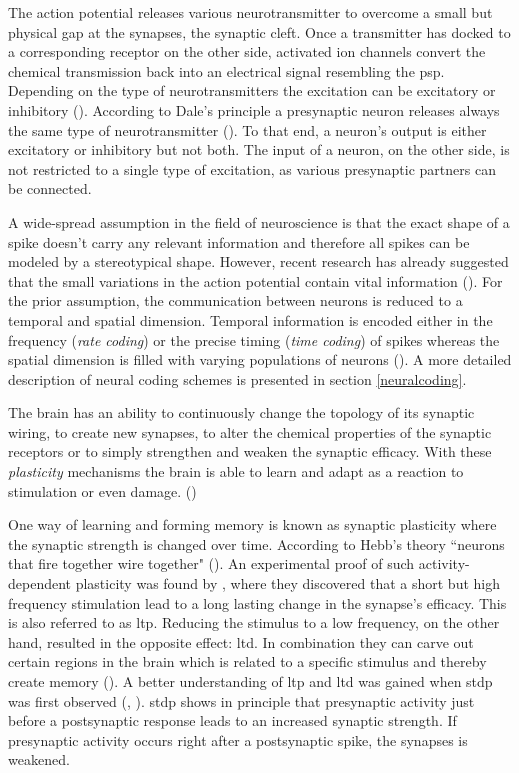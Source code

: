 The action potential releases various neurotransmitter to overcome a small but physical gap at the synapses, the synaptic cleft. Once a transmitter has docked to a corresponding receptor on the other side, activated ion channels convert the chemical transmission back into an electrical signal resembling the \gls{psp}. Depending on the type of neuro\-transmitters the excitation can be excitatory or inhibitory (\citealp{gerstner2014dynamics}). According to Dale's principle a presynaptic neuron releases always the same type of neurotransmitter (\citealp{dale1935pharmacology}). To that end, a neuron's output is either excitatory or inhibitory but not both. The input of a neuron, on the other side, is not restricted to a single type of excitation, as various presynaptic partners can be connected. 

A wide-spread assumption in the field of neuroscience is that the exact shape of a spike doesn't carry any relevant information and therefore all spikes can be modeled by a stereotypical shape. However, recent research has already suggested that the small variations in the action potential contain vital information (\citealp{debanne2013mechanisms}). For the prior assumption, the communication between neurons is reduced to a temporal and spatial dimension. Temporal information is encoded either in the frequency (\emph{rate coding}) or the precise timing (\emph{time coding}) of spikes whereas the spatial dimension is filled with varying populations of neurons (\citealp{gerstner2014dynamics}). A more detailed description of neural coding schemes is presented in section \ref{neuralcoding}.

The brain has an ability to continuously change the topology of its synaptic wiring, to create new synapses, to alter the chemical properties of the synaptic receptors or to simply strengthen and weaken the synaptic efficacy. With these \emph{plasticity} mechanisms the brain is able to learn and adapt as a reaction to stimulation or even damage. (\citealp{gerstner14dynamics})

One way of learning and forming memory is known as synaptic plasticity where the synaptic strength is changed over time. According to Hebb's theory ``neurons that fire together wire together" (\citealp{hebb1949organization}). An experimental proof of such activity-dependent plasticity was found by \citealp{bliss1973long}, where they discovered that a short but high frequency stimulation lead to a long lasting change in the synapse's efficacy. This is also referred to as \gls{ltp}. Reducing the stimulus to a low frequency, on the other hand, resulted in the opposite effect: \gls{ltd}. In combination they can carve out certain regions in the brain which is related to a specific stimulus and thereby create memory (\citealp{nabavi2014engineering}). A better understanding of \gls{ltp} and \gls{ltd} was gained when \gls{stdp} was first observed (\citealp{markram1997regulation}, \citealp{poo98stdp}). \gls{stdp} shows in principle that presynaptic activity just before a postsynaptic response leads to an increased synaptic strength. If presynaptic activity occurs right after a postsynaptic spike, the synapses is weakened. 

